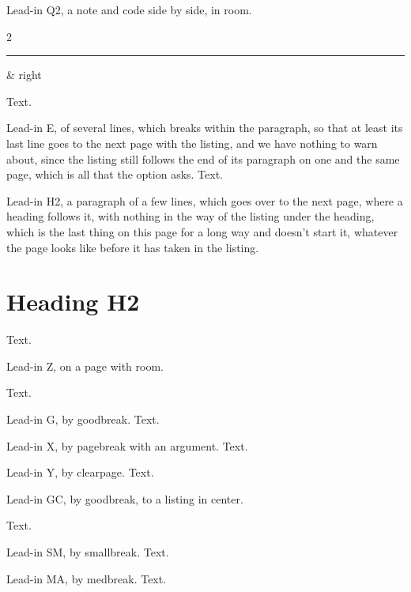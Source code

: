 Lead-in Q2, a note and code side by side, in room.\label{q2}

\begin{didacticpair}{2}
  \rule{1pt}{8\baselineskip}\label{q2L} & right
\end{didacticpair}
Text.

Lead-in E, of several lines, which breaks within the paragraph, so that at least
its last line goes to the next page with the listing, and we have nothing to warn
about, since the listing still follows the end of its paragraph on one and the
same page, which is all that the option asks.\label{e}
Text.

Lead-in H2, a paragraph of a few lines, which goes over to the next page, where a
heading follows it, with nothing in the way of the listing under the heading,
which is the last thing on this page for a long way and doesn't start it, whatever
the page looks like before it has taken in the listing.
\section*{Heading H2\label{hh}}
Text.

\clearpage
Lead-in Z, on a page with room.\label{z}

Text.

Lead-in G, by goodbreak.\label{g}
\goodbreak
{}
Text.

Lead-in X, by pagebreak with an argument.\label{x}
\pagebreak[2]
Text.

Lead-in Y, by clearpage.\label{y}
\clearpage
{}
Text.

Lead-in GC, by goodbreak, to a listing in center.\label{gc}
\goodbreak
\begin{center}
\end{center}
Text.

Lead-in SM, by smallbreak.\label{sm}
\smallbreak
{}
Text.

Lead-in MA, by medbreak.\label{ma}
\medbreak
{}
Text.

